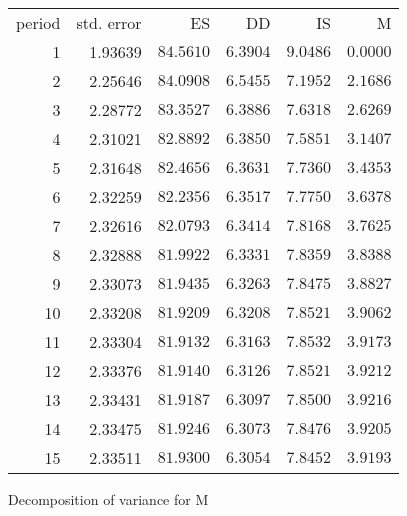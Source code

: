 \documentclass[11pt]{article}
\begin{document}
\begin{longtable}{rrrrrr}
period &  std. error &  ES &  DD &  IS &  M \\
1 & 1.93639 & $84.5610$ & $6.3904$ & $9.0486$ & $0.0000$\\
2 & 2.25646 & $84.0908$ & $6.5455$ & $7.1952$ & $2.1686$\\
3 & 2.28772 & $83.3527$ & $6.3886$ & $7.6318$ & $2.6269$\\
4 & 2.31021 & $82.8892$ & $6.3850$ & $7.5851$ & $3.1407$\\
5 & 2.31648 & $82.4656$ & $6.3631$ & $7.7360$ & $3.4353$\\
6 & 2.32259 & $82.2356$ & $6.3517$ & $7.7750$ & $3.6378$\\
7 & 2.32616 & $82.0793$ & $6.3414$ & $7.8168$ & $3.7625$\\
8 & 2.32888 & $81.9922$ & $6.3331$ & $7.8359$ & $3.8388$\\
9 & 2.33073 & $81.9435$ & $6.3263$ & $7.8475$ & $3.8827$\\
10 & 2.33208 & $81.9209$ & $6.3208$ & $7.8521$ & $3.9062$\\
11 & 2.33304 & $81.9132$ & $6.3163$ & $7.8532$ & $3.9173$\\
12 & 2.33376 & $81.9140$ & $6.3126$ & $7.8521$ & $3.9212$\\
13 & 2.33431 & $81.9187$ & $6.3097$ & $7.8500$ & $3.9216$\\
14 & 2.33475 & $81.9246$ & $6.3073$ & $7.8476$ & $3.9205$\\
15 & 2.33511 & $81.9300$ & $6.3054$ & $7.8452$ & $3.9193$\\
\end{longtable}

\vspace{1em}

Decomposition of variance for M

\vspace{1em}
\end{document}
